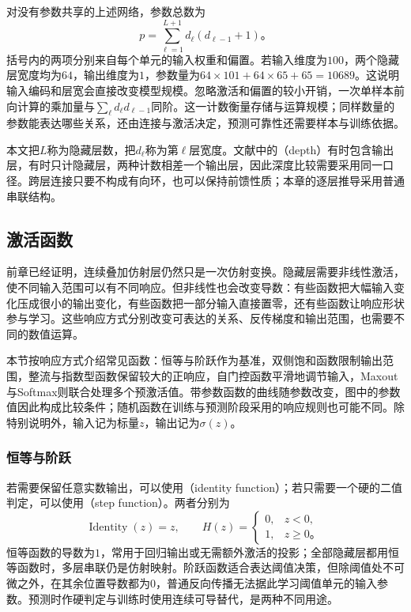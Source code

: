 对没有参数共享的上述网络，参数总数为
\begin{equation}
  p=\sum_{\ell=1}^{L+1}d_\ell(d_{\ell-1}+1)\text{。}
  \label{eq:ffn-parameter-count}
\end{equation}
括号内的两项分别来自每个单元的输入权重和偏置。若输入维度为$100$，两个隐藏层宽度均为$64$，输出维度为$1$，参数量为$64\times101+64\times65+65=10689$。这说明输入编码和层宽会直接改变模型规模。忽略激活和偏置的较小开销，一次单样本前向计算的乘加量与$\sum_\ell d_\ell d_{\ell-1}$同阶。这一计数衡量存储与运算规模；同样数量的参数能表达哪些关系，还由连接与激活决定，预测可靠性还需要样本与训练依据。

本文把$L$称为隐藏层数，把$d_\ell$称为第$\ell$层宽度。文献中的（depth）有时包含输出层，有时只计隐藏层，两种计数相差一个输出层，因此深度比较需要采用同一口径。跨层连接只要不构成有向环，也可以保持前馈性质；本章的逐层推导采用普通串联结构。

\subsection{激活函数}
\label{sec:ffn-activations}

前章已经证明，连续叠加仿射层仍然只是一次仿射变换。隐藏层需要非线性激活，使不同输入范围可以有不同响应。但非线性也会改变导数：有些函数把大幅输入变化压成很小的输出变化，有些函数把一部分输入直接置零，还有些函数让响应形状参与学习。这些响应方式分别改变可表达的关系、反传梯度和输出范围，也需要不同的数值运算。

本节按响应方式介绍常见函数：恒等与阶跃作为基准，双侧饱和函数限制输出范围，整流与指数型函数保留较大的正响应，自门控函数平滑地调节输入，Maxout与Softmax则联合处理多个预激活值。带参数函数的曲线随参数改变，图中的参数值因此构成比较条件；随机函数在训练与预测阶段采用的响应规则也可能不同。除特别说明外，输入记为标量$z$，输出记为$\sigma(z)$。

\subsubsection{恒等与阶跃}
\label{sec:ffn-activation-baselines}

若需要保留任意实数输出，可以使用（identity function）；若只需要一个硬的二值判定，可以使用（step function）。两者分别为
\begin{equation}
  \operatorname{Identity}(z)=z,
  \qquad
  H(z)=\begin{cases}0,&z<0,\\1,&z\geq0\text{。}\end{cases}
  \label{eq:ffn-identity-step}
\end{equation}
恒等函数的导数为$1$，常用于回归输出或无需额外激活的投影；全部隐藏层都用恒等函数时，多层串联仍是仿射映射。阶跃函数适合表达阈值决策，但除阈值处不可微之外，在其余位置导数都为$0$，普通反向传播无法据此学习阈值单元的输入参数。预测时作硬判定与训练时使用连续可导替代，是两种不同用途。

